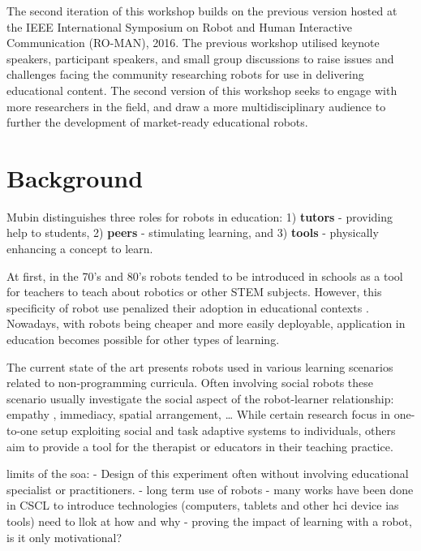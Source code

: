 \documentclass{sig-alternate-05-2015}
\begin{document}
The second iteration of this workshop builds on the previous version hosted at 
the IEEE International Symposium on Robot and Human Interactive Communication 
(RO-MAN), 2016. The previous workshop utilised keynote speakers, participant 
speakers, and small group discussions to raise issues and challenges facing the 
community researching robots for use in delivering educational content. The 
second version of this workshop seeks to engage with more researchers in the 
field, and draw a more multidisciplinary audience to further the development of 
market-ready educational robots.

\section{Background}


Mubin \cite{mubin2013review} distinguishes three roles for robots in education:
1) \textbf{tutors} - providing help to students, 2) \textbf{peers} - stimulating learning, and 3) \textbf{tools} - physically enhancing a concept to learn.

At first, in the 70's and 80's robots tended to be introduced in schools as a tool for teachers to teach about robotics or other STEM subjects. 
However, this specificity of robot use penalized their adoption in educational contexts \cite{}. 
Nowadays, with robots being cheaper and more easily deployable, application in education becomes possible for other types of learning.  


The current state of the art presents robots used in various learning scenarios related to non-programming curricula. 
Often involving social robots these scenario usually investigate the social aspect of the robot-learner relationship: empathy \cite{castellano2013towards}, immediacy, spatial arrangement\cite{}, \dots
While certain research focus in one-to-one setup \cite{} exploiting social and task adaptive systems to individuals, others aim to provide a tool for the therapist or educators in  their teaching practice\cite{}. 

limits of the soa:
- Design of this experiment often without involving educational specialist or practitioners. 
- long term use of robots
- many works have been done in CSCL to introduce technologies (computers, tablets and other hci device ias tools) need to llok at how and why
- proving the impact of learning with a robot, is it only motivational?
\end{document}
